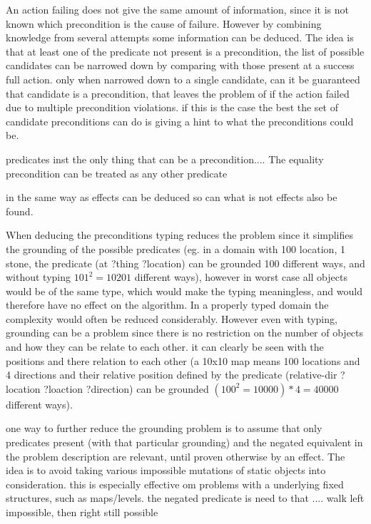 	An action failing does not give the same amount of information, since it is not known which precondition is the cause of failure. However by combining knowledge from several attempts some information can be deduced. The idea is that at least one of the predicate not present is a precondition, the list of possible candidates can be narrowed down by comparing with those present at a success full action. only when narrowed down to a single candidate, can it be guaranteed that candidate is a precondition, that leaves the problem of if the action failed due to multiple precondition violations. if this is the case the best the set of candidate preconditions can do is giving a hint to what the preconditions could be.
	
	
	predicates inst the only thing that can be a precondition....
	The equality precondition can be treated as any other predicate
	
	in the same way as effects can be deduced so can what is not effects also be found. 

	
	
	
%		
%			
%	
%

	
	
			
	When deducing the preconditions typing reduces the problem since it simplifies the grounding of the possible predicates	(eg. in a domain  with 100 location, 1 stone, the predicate (at ?thing ?location) can be grounded 100 different ways, and without typing $101 ^ 2 = 10201$ different ways), however in worst case all objects would be of the same type, which would make the typing meaningless, and would therefore have no effect on the algorithm. In a properly typed domain the complexity would often be reduced considerably. However even with typing, grounding can be a problem since there is no restriction on the number of objects and how they can be relate to each other. it can clearly be seen with the positions and there relation to each other (a 10x10 map means 100 locations and 4 directions and their relative position defined by the predicate (relative-dir ?location ?loaction ?direction) can be grounded $(100 ^ 2 = 10000)*4=40000$ different ways).
	
	one way to further reduce the grounding problem is to assume that only predicates present (with that particular grounding) and the negated equivalent in the problem description are relevant, until proven otherwise by an effect. The idea is to avoid taking various impossible mutations of static objects into consideration. this is especially effective om problems with a underlying fixed structures, such as maps/levels. the negated predicate is need to that .... walk left impossible, then right still possible
	
